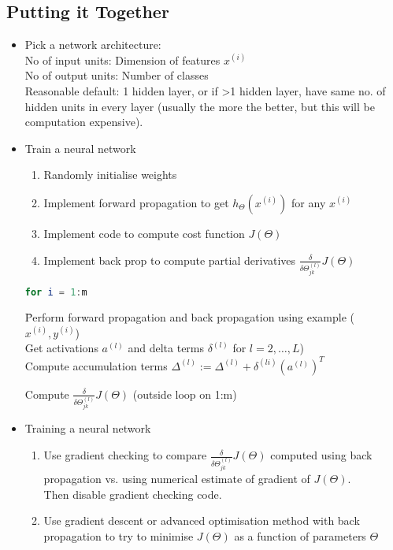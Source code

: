 \documentclass{scrartcl}
\begin{document}
\subsection{Putting it Together}
\label{sec:9-7}
\begin{itemize}
\item Pick a network architecture:\\
  No of input units: Dimension of features $x^{(i)}$ \\
  No of output units: Number of classes \\
  Reasonable default: 1 hidden layer, or if >1 hidden layer, have same
  no. of hidden units in every layer (usually the more the better, but
  this will be computation expensive).
\item Train a neural network
  \begin{enumerate}
  \item Randomly initialise weights
  \item Implement forward propagation to get $h_\Theta(x^{(i)})$ for
    any $x^{(i)}$
  \item Implement code to compute cost function $J(\Theta)$
  \item Implement back prop to compute partial derivatives
    $\frac{\delta}{\delta\Theta_{jk}^{(l)}} J(\Theta)$
  \end{enumerate}
  \begin{lstlisting}[language=Octave]
    for i = 1:m
  \end{lstlisting}
  \begin{tabbing}
    \quad \quad \quad \quad \= Perform forward propagation and back propagation using
    example ($x^{(i)}, y^{(i)}$)  \\
    \>Get activations $a^{(l)}$ and delta terms $\delta^{(l)}$ for $l=2,
    \dots, L$)\\
    \>Compute accumulation terms $\Delta^{(l)} := \Delta^{(l)} +
    \delta^{(li)}(a^{(l)})^T$
  \end{tabbing} 
  Compute $\frac{\delta}{\delta \Theta_{jk}^{(l)}} J(\Theta)$ (outside
  loop on 1:m)
\item Training a neural network
  \begin{enumerate}
  \item Use gradient checking to compare $\frac{\delta}{\delta
      \Theta_{jk}^{(l)}} J(\Theta)$ computed using back propagation
    vs. using numerical estimate of gradient of $J(\Theta)$. \\
    Then disable gradient checking code.
  \item Use gradient descent or advanced optimisation method with back
    propagation to try to minimise $J(\Theta)$ as a function of
    parameters $\Theta$
  \end{enumerate}
\end{itemize}
\end{document}
